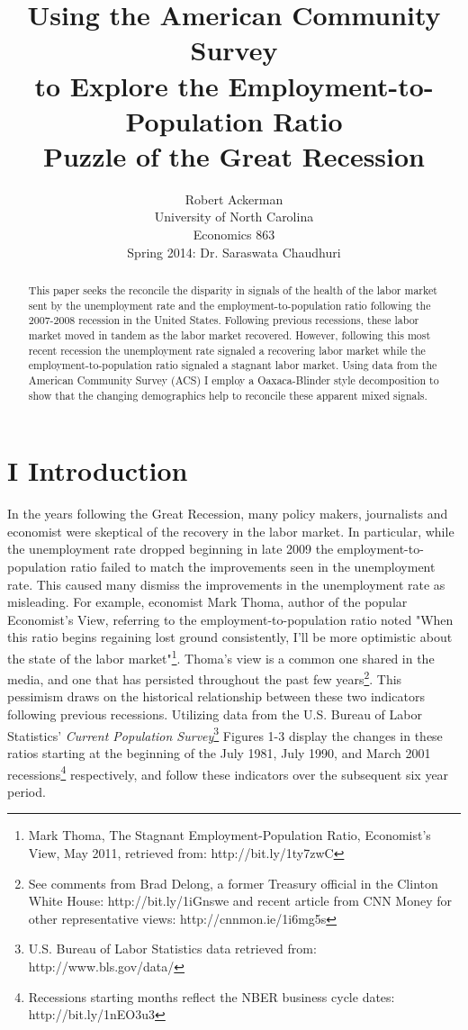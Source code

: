 \documentclass[11pt]{article}
\title{Using the American Community Survey \\ to Explore the Employment-to-Population Ratio \\ Puzzle of the Great Recession}
\author{Robert Ackerman \\ University of North Carolina \\ Economics 863 \\ Spring 2014: Dr. Saraswata Chaudhuri}
\theoremstyle{definition}
\begin{document}
\maketitle

\begin{abstract}
This paper seeks the reconcile the disparity in signals of the health of the labor market sent by the unemployment rate and the employment-to-population ratio following  the 2007-2008 recession in the United States.  Following previous recessions, these labor market moved in tandem as the labor market recovered.  However, following this most recent recession the unemployment rate signaled a recovering labor market while the employment-to-population ratio signaled a stagnant labor market.  Using data from the American Community Survey (ACS) I employ a Oaxaca-Blinder style decomposition to show that the changing demographics help to reconcile these apparent mixed signals.  
\end{abstract}

\section*{ I Introduction}
\indent
\par
In the years following the Great Recession, many policy makers, journalists and economist were skeptical of the recovery in the labor market.  In particular, while the unemployment rate dropped beginning in late 2009 the employment-to-population ratio failed to match the improvements seen in the unemployment rate.  This caused many dismiss the improvements in the unemployment rate as misleading.  For example, economist Mark Thoma, author of the popular Economist's View, referring to the employment-to-population ratio noted "When this ratio begins regaining lost ground consistently, I'll be more optimistic about the state of the labor market"\footnote{Mark Thoma, The Stagnant Employment-Population Ratio, Economist's View, May 2011, retrieved from: http://bit.ly/1ty7zwC}.  Thoma's view is a common one shared in the media, and one that has persisted throughout the past few years\footnote{See comments from Brad Delong, a former Treasury official in the Clinton White House: http://bit.ly/1iGnswe and recent article from CNN Money for other representative views: http://cnnmon.ie/1i6mg5s}.  This pessimism draws on the historical relationship between these two indicators following previous recessions.  Utilizing data from the U.S. Bureau of Labor Statistics' \textit{Current Population Survey}\footnote{U.S. Bureau of Labor Statistics data retrieved from: http://www.bls.gov/data/} Figures 1-3 display the changes in these ratios starting at the beginning of the July 1981, July 1990, and March 2001 recessions\footnote{Recessions starting months reflect the NBER business cycle dates: http://bit.ly/1nEO3u3} respectively, and follow these indicators over the subsequent six year period.  
\end{document}
